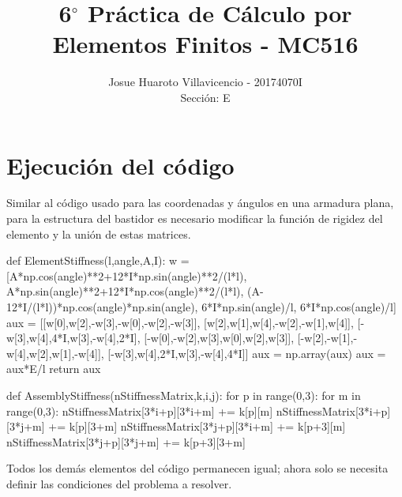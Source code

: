 \documentclass[10pt,a4paper]{article}
\author{Josue Huaroto Villavicencio - 20174070I\\Sección: E}
\title{6$^{\circ}$ Práctica de Cálculo por Elementos Finitos - MC516}
\begin{document}

\maketitle

\section{Ejecución del código}
Similar al código usado para las coordenadas y ángulos en una armadura plana, para la estructura del bastidor es necesario modificar la función de rigidez del elemento y la unión de estas matrices.
\begin{pyglist}[language=python,caption={Ensamble de la matriz de rigidez},style=pastie]
def ElementStiffness(l,angle,A,I):
    w = [A*np.cos(angle)**2+12*I*np.sin(angle)**2/(l*l),
         A*np.sin(angle)**2+12*I*np.cos(angle)**2/(l*l),
         (A-12*I/(l*l))*np.cos(angle)*np.sin(angle),
         6*I*np.sin(angle)/l,
         6*I*np.cos(angle)/l]
    aux = [[w[0],w[2],-w[3],-w[0],-w[2],-w[3]],
           [w[2],w[1],w[4],-w[2],-w[1],w[4]],
           [-w[3],w[4],4*I,w[3],-w[4],2*I],
           [-w[0],-w[2],w[3],w[0],w[2],w[3]],
           [-w[2],-w[1],-w[4],w[2],w[1],-w[4]],
           [-w[3],w[4],2*I,w[3],-w[4],4*I]]
    aux = np.array(aux)
    aux = aux*E/l
    return aux
    
def AssemblyStiffness(nStiffnessMatrix,k,i,j):
    for p in range(0,3):
        for m in range(0,3):
            nStiffnessMatrix[3*i+p][3*i+m] += k[p][m]
            nStiffnessMatrix[3*i+p][3*j+m] += k[p][3+m]
            nStiffnessMatrix[3*j+p][3*i+m] += k[p+3][m]
            nStiffnessMatrix[3*j+p][3*j+m] += k[p+3][3+m]
\end{pyglist}
Todos los demás elementos del código permanecen igual; ahora solo se necesita definir las condiciones del problema a resolver.
\end{document}

